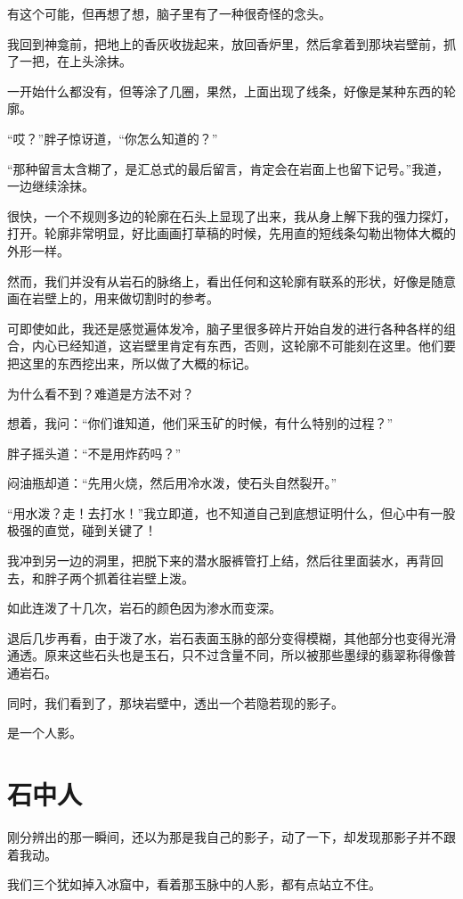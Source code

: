 有这个可能，但再想了想，脑子里有了一种很奇怪的念头。

我回到神龛前，把地上的香灰收拢起来，放回香炉里，然后拿着到那块岩壁前，抓了一把，在上头涂抹。

一开始什么都没有，但等涂了几圈，果然，上面出现了线条，好像是某种东西的轮廓。

“哎？”胖子惊讶道，“你怎么知道的？”

“那种留言太含糊了，是汇总式的最后留言，肯定会在岩面上也留下记号。”我道，一边继续涂抹。

很快，一个不规则多边的轮廓在石头上显现了出来，我从身上解下我的强力探灯，打开。轮廓非常明显，好比画画打草稿的时候，先用直的短线条勾勒出物体大概的外形一样。

然而，我们并没有从岩石的脉络上，看出任何和这轮廓有联系的形状，好像是随意画在岩壁上的，用来做切割时的参考。

可即使如此，我还是感觉遍体发冷，脑子里很多碎片开始自发的进行各种各样的组合，内心已经知道，这岩壁里肯定有东西，否则，这轮廓不可能刻在这里。他们要把这里的东西挖出来，所以做了大概的标记。

为什么看不到？难道是方法不对？

想着，我问：“你们谁知道，他们采玉矿的时候，有什么特别的过程？”

胖子摇头道：“不是用炸药吗？”

闷油瓶却道：“先用火烧，然后用冷水泼，使石头自然裂开。”

“用水泼？走！去打水！”我立即道，也不知道自己到底想证明什么，但心中有一股极强的直觉，碰到关键了！

我冲到另一边的洞里，把脱下来的潜水服裤管打上结，然后往里面装水，再背回去，和胖子两个抓着往岩壁上泼。

如此连泼了十几次，岩石的颜色因为渗水而变深。

退后几步再看，由于泼了水，岩石表面玉脉的部分变得模糊，其他部分也变得光滑通透。原来这些石头也是玉石，只不过含量不同，所以被那些墨绿的翡翠称得像普通岩石。

同时，我们看到了，那块岩壁中，透出一个若隐若现的影子。

是一个人影。

\chapter{石中人}

刚分辨出的那一瞬间，还以为那是我自己的影子，动了一下，却发现那影子并不跟着我动。

我们三个犹如掉入冰窟中，看着那玉脉中的人影，都有点站立不住。

